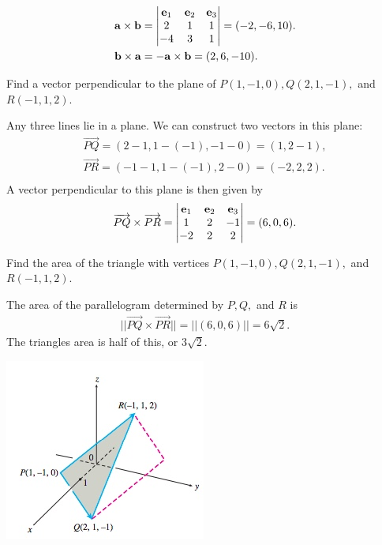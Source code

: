 \documentclass[12pt,letterpaper,reqno]{article}
\numberwithin{equation}{section}
\begin{document}
{\color{red} 
\begin{align*}
	{\bf a} \times {\bf b}&=\begin{vmatrix}
		{\bf e}_1 & {\bf e}_2 & {\bf e}_3 \\
		2 & 1 & 1 \\
		-4 & 3 & 1
	\end{vmatrix}
	=(-2,-6,10). \\
	{\bf b} \times {\bf a}&=-{\bf a} \times {\bf b}=(2,6,-10).
\end{align*}
}

\begin{exercise}
Find a vector perpendicular to the plane of $P(1,-1,0), Q(2,1,-1),$ and $R(-1,1,2)$.	
\end{exercise}

{\color{red} 
Any three lines lie in a plane. We can construct two vectors in this plane:
\begin{align*}
	\overrightarrow{PQ}=(2-1,1-(-1),-1-0)=(1,2-1), \\
	\overrightarrow{PR}=(-1-1,1-(-1),2-0)=(-2,2,2). \\
\end{align*}
A vector perpendicular to this plane is then given by
\begin{align*}
	\overrightarrow{PQ} \times \overrightarrow{PR} =\begin{vmatrix}
		{\bf e}_1 & {\bf e}_2 & {\bf e}_3 \\
		1 & 2 & -1 \\ -2 & 2 & 2
	\end{vmatrix} = (6,0,6).
\end{align*}}

\begin{exercise}
	Find the area of the triangle with vertices $P(1,-1,0), Q(2,1,-1),$ and $R(-1,1,2)$.
\end{exercise}
{\color{red} 
The area of the parallelogram determined by $P,Q,$ and $R$ is 
\begin{align*}
	||\overrightarrow{PQ} \times \overrightarrow{PR}||=||(6,0,6)||=6\sqrt{2}.
\end{align*}
The triangles area is half of this, or $3\sqrt{2}$.
\begin{center}
	\includegraphics[scale=0.5]{figures_mvc/triangle_area_cross_product}
\end{center}
}
\end{document}
